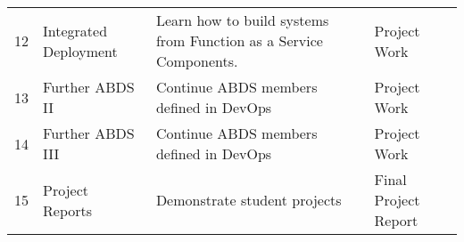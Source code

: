 \begin{table}[h]
\begin{tabular}{p{1cm}p{4cm}p{6cm}p{2cm}}
12    & Integrated Deployment  & Learn how to build systems from Function as a Service Components.                & Project Work                  \\
13    & Further ABDS II        & Continue ABDS members defined in DevOps                                          & Project Work                  \\
14    & Further ABDS III       & Continue ABDS members defined in DevOps                                          & Project Work                  \\
15    & Project Reports        & Demonstrate student projects                                                     & Final Project Report         
\end{tabular}
\end{table}